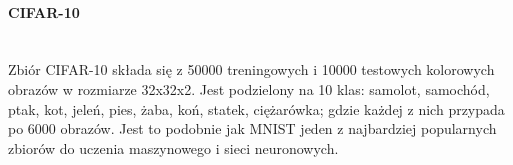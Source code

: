 \paragraph{CIFAR-10} \mbox{}\\
Zbiór CIFAR-10 \cite{CIFAR-10} składa się z 50000 treningowych i 10000 testowych kolorowych obrazów w rozmiarze
32x32x2. Jest podzielony na 10 klas: samolot, samochód, ptak, kot, jeleń, pies, żaba,
koń, statek, ciężarówka; gdzie każdej z nich przypada po 6000 obrazów. Jest to podobnie
jak MNIST jeden z najbardziej popularnych zbiorów do uczenia maszynowego i sieci neuronowych.
